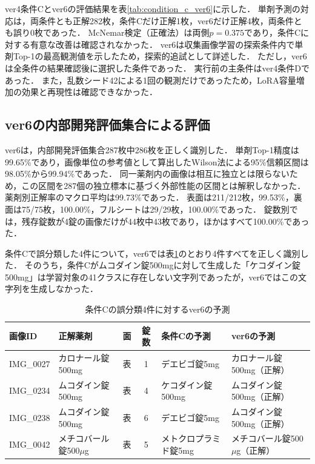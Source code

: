 \documentclass[uplatex,dvipdfmx]{jsarticle}
\begin{document}
ver4条件Cとver6の評価結果を表\ref{tab:condition_c_ver6}に示した．
単剤予測の対応は，両条件とも正解282枚，条件Cだけ正解1枚，ver6だけ正解4枚，両条件とも誤り0枚であった．
McNemar検定（正確法）は両側$p=0.375$であり，条件Cに対する有意な改善は確認されなかった．
ver6は収集画像学習の探索条件内で単剤Top-1の最高観測値を示したため，探索的追試として詳述した．
ただし，ver6は全条件の結果確認後に選択した条件であった．
実行前の主条件はver4条件Dであった．
また，乱数シード42による1回の観測だけであったため，LoRA容量増加の効果と再現性は確認できなかった．

\subsection{ver6の内部開発評価集合による評価}\label{sec:ver6_single}

ver6は，内部開発評価集合287枚中286枚を正しく識別した．
単剤Top-1精度は99.65\%であり，画像単位の参考値として算出したWilson法による95\%信頼区間は98.05\%から99.94\%であった．
同一薬剤内の画像は相互に独立とは限らないため，この区間を287個の独立標本に基づく外部性能の区間とは解釈しなかった．
薬剤別正解率のマクロ平均は99.73\%であった．
表面は211/212枚，99.53\%，裏面は75/75枚，100.00\%，フルシートは29/29枚，100.00\%であった．
錠数別では，残存錠数が4錠の画像だけが44枚中43枚であり，ほかはすべて100.00\%であった．

条件Cで誤分類した4件について，ver6では表\ref{tab:condition_c_errors_resolved}のとおり4件すべてを正しく識別した．
そのうち，条件Cがムコダイン錠500mgに対して生成した「ケコダイン錠500mg」は学習対象の41クラスに存在しない文字列であったが，ver6ではこの文字列を生成しなかった．

\begin{table}[H]
  \centering
  \caption{条件Cの誤分類4件に対するver6の予測}
  \label{tab:condition_c_errors_resolved}
  \scriptsize
  \setlength{\tabcolsep}{2pt}
  \begin{tabular}{|p{3.2cm}|p{2.7cm}|c|c|p{2.7cm}|p{2.9cm}|}
    \hline
    画像ID & 正解薬剤 & 面 & 錠数 & 条件Cの予測 & ver6の予測 \\ \hline
    IMG\_0027 & カロナール錠500mg & 表 & 1 & デエビゴ錠5mg & カロナール錠500mg（正解） \\ \hline
    IMG\_0234 & ムコダイン錠500mg & 表 & 4 & ケコダイン錠500mg & ムコダイン錠500mg（正解） \\ \hline
    IMG\_0238 & ムコダイン錠500mg & 表 & 6 & デエビゴ錠5mg & ムコダイン錠500mg（正解） \\ \hline
    IMG\_0042 & メチコバール錠500$\mu$g & 表 & 5 & メトクロプラミド錠5mg & メチコバール錠500$\mu$g（正解） \\ \hline
  \end{tabular}
\end{table}
\end{document}
